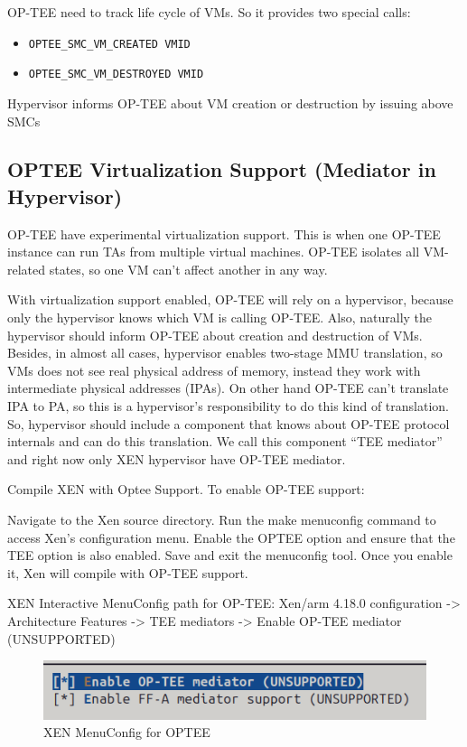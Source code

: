 \documentclass[acmtog]{acmart}
\begin{document}
OP-TEE need to track life cycle of VMs. So it provides two special
calls: 
\begin{itemize}
  \item \texttt{OPTEE\_SMC\_VM\_CREATED VMID}
  \item \texttt{OPTEE\_SMC\_VM\_DESTROYED VMID}
\end{itemize}
Hypervisor informs OP-TEE about VM creation or destruction by
issuing above SMCs
\subsection{OPTEE Virtualization Support (Mediator in Hypervisor)}
OP-TEE have experimental virtualization support. This is when one OP-TEE instance can run TAs from multiple virtual machines. OP-TEE isolates all VM-related states, so one VM can’t affect another in any way.

With virtualization support enabled, OP-TEE will rely on a hypervisor, because only the hypervisor knows which VM is calling OP-TEE. Also, naturally the hypervisor should inform OP-TEE about creation and destruction of VMs. Besides, in almost all cases, hypervisor enables two-stage MMU translation, so VMs does not see real physical address of memory, instead they work with intermediate physical addresses (IPAs). On other hand OP-TEE can’t translate IPA to PA, so this is a hypervisor’s responsibility to do this kind of translation. So, hypervisor should include a component that knows about OP-TEE protocol internals and can do this translation. We call this component “TEE mediator” and right now only XEN hypervisor have OP-TEE mediator.

Compile XEN with Optee Support. To enable OP-TEE support:

Navigate to the Xen source directory.
Run the make menuconfig command to access Xen’s configuration menu.
Enable the OPTEE option and ensure that the TEE option is also enabled.
Save and exit the menuconfig tool.
Once you enable it, Xen will compile with OP-TEE support.

XEN Interactive MenuConfig path for OP-TEE: 
Xen/arm 4.18.0 configuration -> Architecture Features -> TEE mediators -> Enable OP-TEE mediator (UNSUPPORTED)

\begin{figure}[ht]
  \centering
  \includegraphics[width=\columnwidth]{images/optee_xen_support.png}
  \caption{XEN MenuConfig for OPTEE}
  \label{fig:image_label}
\end{figure}
\end{document}
